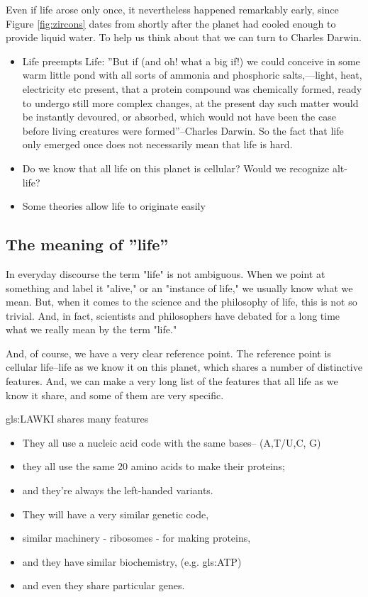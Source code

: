 \documentclass[]{article}
\begin{document}
 Even if life arose only once, it nevertheless happened remarkably early, since Figure \ref{fig:zircons} dates from shortly after the planet had cooled enough to provide liquid water. To help us think about that we can turn to Charles Darwin.
\begin{itemize}
	\item Life preempts Life: ''But if (and oh! what a big if!) we could conceive in some warm little pond with all sorts of ammonia and phosphoric salts,—light, heat, electricity etc present, that a protein compound was chemically formed, ready to undergo still more complex changes, at the present day such matter would be instantly devoured, or absorbed, which would not have been the case before living creatures were formed''--Charles Darwin\cite{darwin1871letter}. So the fact that life only emerged once does not necessarily mean that life is hard.
	
	\item Do we know that all life on this planet is cellular? Would we recognize alt-life?
	
	\item Some theories allow life to originate easily\cite{wachtershauser1988before}
\end{itemize}

\subsection{The meaning of ''life''}
In everyday discourse the term "life" is not ambiguous.
When we point at something and label it "alive," or an "instance of life," we usually know what we mean.
But, when it comes to the science and the philosophy of life, this is not so trivial.
And, in fact, scientists and philosophers have debated for a long time what we really mean by the term "life."

And, of course, we have a very clear reference point.
The reference point is cellular life--life as we know it on this planet,
which shares a number of distinctive features.
And, we can make a very long list of the features that all life as we know it share, and some of them are very specific.

\gls{gls:LAWKI} shares many features
\begin{itemize}
	\item They all use a nucleic acid code 	with the same bases-- (A,T/U,C, G)
	\item they all use the same 20 amino acids
	to make their proteins;
	\item and they're always
	the left-handed variants.
	\item They will have a very similar
	genetic code,
	\item similar machinery - ribosomes -
	for making proteins,
	\item and they have similar biochemistry, (e.g. \gls{gls:ATP})
	\item and even they share particular genes.
\end{itemize}
\end{document}
